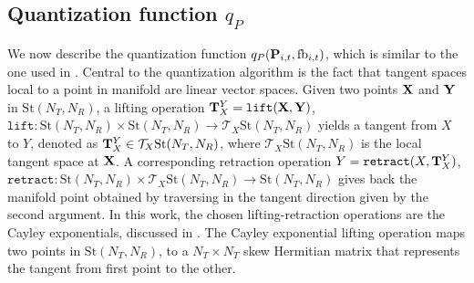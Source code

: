 \documentclass[conference]{IEEEtran}
\begin{document}
\subsection{Quantization function $q_P$}
\label{qp}
We now describe the quantization function $q_P({\bf P}_{i,t},\text{fb}_{i,t})$, which is similar to the one used in \cite{6891198,Gupt1905:Predictive,6545375}.
Central to the quantization algorithm is the fact that tangent spaces local to a point in manifold are linear vector spaces.
Given two points ${\bf X}$ and ${\bf Y}$ in $\text{St}(N_T,N_R)$, a lifting operation ${\bf T}^Y_X=\texttt{lift}({\bf X},{\bf Y})$, $\texttt{lift}:\text{St}(N_T,N_R)\times \text{St}(N_T,N_R) \to \mathcal{T}_X \text{St}(N_T,N_R)$ yields a tangent from $X$ to $Y$, denoted as ${\bf T}^Y_X \in \mathcal{T}_X \text{St}(N_T,N_R)$, where $\mathcal{T}_X \text{St}(N_T,N_R)$ is the local tangent space at ${\bf X}$.
A corresponding retraction operation $Y=\texttt{retract}(X,{\bf T}^Y_X)$, $\texttt{retract}: \text{St}(N_T,N_R)\times \mathcal{T}_X \text{St}(N_T,N_R) \to \text{St}(N_T,N_R)$ gives back the manifold point obtained by traversing in the tangent direction given by the second argument.
In this work, the chosen lifting-retraction operations are the Cayley exponentials, discussed in \cite{DBLP:journals/corr/abs-1708-00045,Gupt1905:Predictive}. %
The Cayley exponential lifting operation maps two points in $\text{St}(N_T,N_R)$, to a $N_T\times N_T$ skew Hermitian matrix that represents the tangent from first point to the other.
\end{document}
